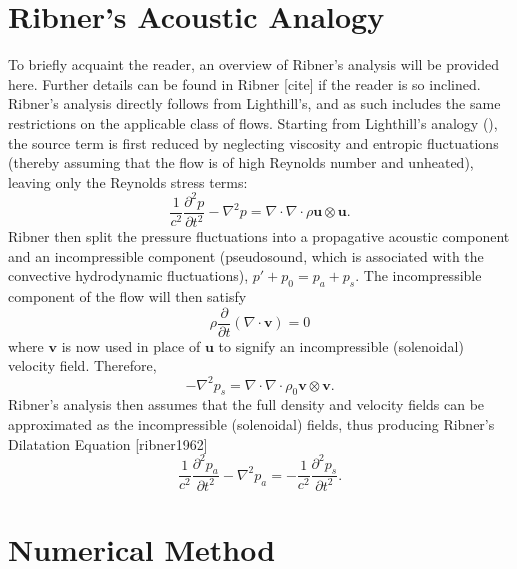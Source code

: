 \section{Ribner's Acoustic Analogy}
To briefly acquaint the reader, an overview of Ribner's analysis will be provided here.
Further details can be found in Ribner [cite] if the reader is so inclined. 
Ribner's analysis directly follows from Lighthill's, and as such includes the same restrictions on the applicable class of flows.
Starting from Lighthill's analogy (), the source term is first reduced by neglecting viscosity and entropic fluctuations (thereby assuming that the flow is of high Reynolds number and unheated), leaving only the Reynolds stress terms:
\begin{equation}
	\frac{1}{c^2}\frac{\partial^2 p}{\partial t^2} - \nabla^2 p = \nabla \cdot \nabla \cdot \rho \mathbf{u} \otimes \mathbf{u}.
\end{equation}
Ribner then split the pressure fluctuations into a propagative acoustic component and an incompressible component (pseudosound, which is associated with the convective hydrodynamic fluctuations), $p' + p_0 = p_a + p_s$. 
The incompressible component of the flow will then satisfy
\begin{equation}
	 \rho \frac{\partial}{\partial t} (\nabla \cdot \mathbf{v} )  = 0
\end{equation}
where $\mathbf{v}$ is now used in place of $\mathbf{u}$ to signify an incompressible (solenoidal) velocity field. 
Therefore, 
\begin{equation}
	- \nabla^2 p_s = \nabla \cdot \nabla \cdot \rho_0 \mathbf{v} \otimes \mathbf{v}.
\end{equation}
Ribner's analysis then assumes that the full density and velocity fields can be approximated as the incompressible (solenoidal) fields, thus producing Ribner's Dilatation Equation [ribner1962]
\begin{equation}
	\frac{1}{c^2}\frac{\partial^2 p_a}{\partial t^2} - \nabla^2 p_a = -\frac{1}{c^2}\frac{\partial^2 p_s}{\partial t^2}.
\end{equation} 


\section{Numerical Method}
